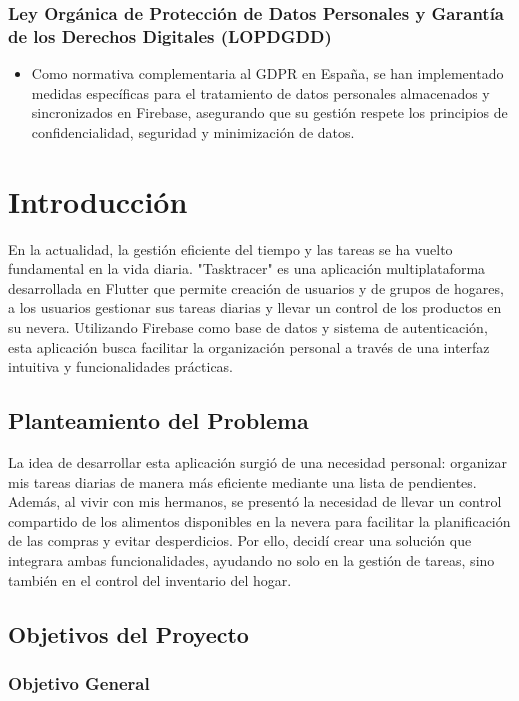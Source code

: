 \documentclass{article}
\begin{document}
\begin{flushleft}
\subsubsection*{Ley Org\'anica de Protecci\'on de Datos Personales y Garant\'ia de los Derechos Digitales (LOPDGDD)}
\begin{itemize}
    \item Como normativa complementaria al GDPR en Espa\~na, se han implementado medidas espec\'ificas para el tratamiento de datos personales almacenados y sincronizados en Firebase, asegurando que su gesti\'on respete los principios de confidencialidad, seguridad y minimizaci\'on de datos.
\end{itemize}

        \section{Introducción}
             En la actualidad, la gestión eficiente del tiempo y las tareas se ha vuelto fundamental en la vida diaria. "Tasktracer" es una aplicación multiplataforma desarrollada en Flutter que permite creación de usuarios y de grupos de hogares,  a los usuarios gestionar sus tareas diarias y llevar un control de los productos en su nevera. Utilizando Firebase como base de datos y sistema de autenticación, esta aplicación busca facilitar la organización personal a través de una interfaz intuitiva y funcionalidades prácticas.
        
        \subsection{Planteamiento del Problema}
        La idea de desarrollar esta aplicación surgió de una necesidad personal: organizar mis tareas diarias de manera más eficiente mediante una lista de pendientes. Además, al vivir con mis hermanos, se presentó la necesidad de llevar un control compartido de los alimentos disponibles en la nevera para facilitar la planificación de las compras y evitar desperdicios. Por ello, decidí crear una solución que integrara ambas funcionalidades, ayudando no solo en la gestión de tareas, sino también en el control del inventario del hogar.


     \subsection{Objetivos del Proyecto}

\subsubsection{Objetivo General}


\end{flushleft}
\end{document}
